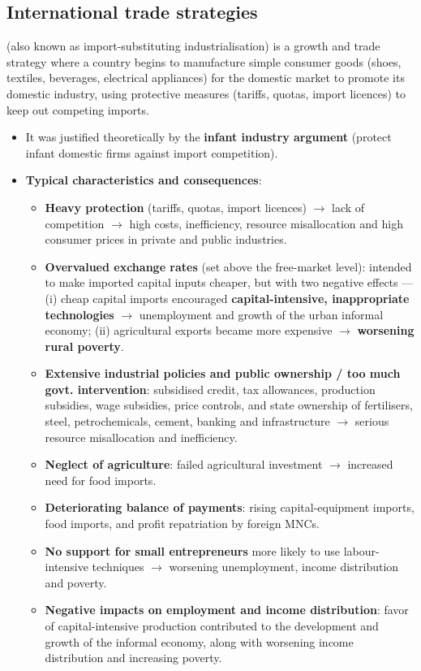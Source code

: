 \subsection{International trade strategies}
 (also known as import-substituting industrialisation) is a growth and trade strategy where a country begins to manufacture simple consumer goods (shoes, textiles, beverages, electrical appliances) for the domestic market to promote its domestic industry, using protective measures (tariffs, quotas, import licences) to keep out competing imports.
\begin{itemize}
  \item It was justified theoretically by the \textbf{infant industry argument} (protect infant domestic firms against import competition).
  \item \textbf{Typical characteristics and consequences}:
  \begin{itemize}
    \item \textbf{Heavy protection} (tariffs, quotas, import licences) $\to$ lack of competition $\to$ high costs, inefficiency, resource misallocation and high consumer prices in private and public industries.
    \item \textbf{Overvalued exchange rates} (set above the free-market level): intended to make imported capital inputs cheaper, but with two negative effects --- (i) cheap capital imports encouraged \textbf{capital-intensive, inappropriate technologies} $\to$ unemployment and growth of the urban informal economy; (ii) agricultural exports became more expensive $\to$ \textbf{worsening rural poverty}.
    \item \textbf{Extensive industrial policies and public ownership / too much govt. intervention}: subsidised credit, tax allowances, production subsidies, wage subsidies, price controls, and state ownership of fertilisers, steel, petrochemicals, cement, banking and infrastructure $\to$ serious resource misallocation and inefficiency.
    \item \textbf{Neglect of agriculture}: failed agricultural investment $\to$ increased need for food imports.
    \item \textbf{Deteriorating balance of payments}: rising capital-equipment imports, food imports, and profit repatriation by foreign MNCs.
    \item \textbf{No support for small entrepreneurs} more likely to use labour-intensive techniques $\to$ worsening unemployment, income distribution and poverty.
    \item \textbf{Negative impacts on employment and income distribution}: favor of capital-intensive production contributed to the development and growth of the informal economy, along with worsening income distribution and increasing poverty.

\end{itemize}
\end{itemize}
